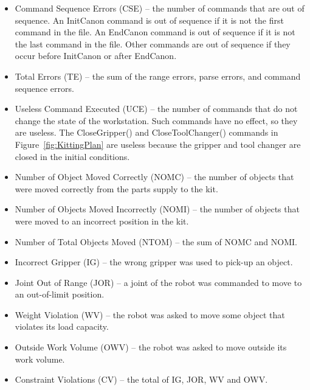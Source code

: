 \begin{itemize}
\item \sf Command Sequence Errors (CSE) \rm -- the number of commands that are
  out of sequence. An InitCanon command is out of sequence if it is not the
  first command in the file. An EndCanon command is out of sequence if it
  is not the last command in the file. Other commands are out of sequence
  if they occur before InitCanon or after EndCanon.\\

\item \sf Total Errors (TE) \rm -- the sum of the range errors, parse errors,
  and command sequence errors.\\

\item \sf Useless Command Executed (UCE) \rm -- the number of commands that do
  not change the state of the workstation. Such commands have no effect, so
  they are useless. The \sf CloseGripper() \rm and \sf CloseToolChanger()
  \rm commands in Figure~\ref{fig:KittingPlan} are useless because the
  gripper and tool changer are closed in the initial conditions.\\
  
\item \sf Number of Object Moved Correctly (NOMC) \rm -- the number of objects
  that were moved correctly from the parts supply to the kit.\\

\item \sf Number of Objects Moved Incorrectly (NOMI) \rm -- the number of objects
  that were moved to an incorrect position in the kit.\\
  
\item \sf Number of Total Objects Moved (NTOM) \rm -- the sum of NOMC and NOMI.\\

\item \sf Incorrect Gripper (IG) \rm -- the wrong gripper was used to pick-up an object.\\

\item \sf Joint Out of Range (JOR) \rm -- a joint of the robot was commanded to 
  move to an out-of-limit position.\\

\item \sf Weight Violation (WV) \rm -- the robot was asked to move some object that
  violates its load capacity.\\
  
\item \sf Outside Work Volume (OWV) \rm -- the robot was asked to move outside its
  work volume.\\
  
\item \sf Constraint Violations (CV) \rm -- the total of IG, JOR, WV and OWV.

\end{itemize}

